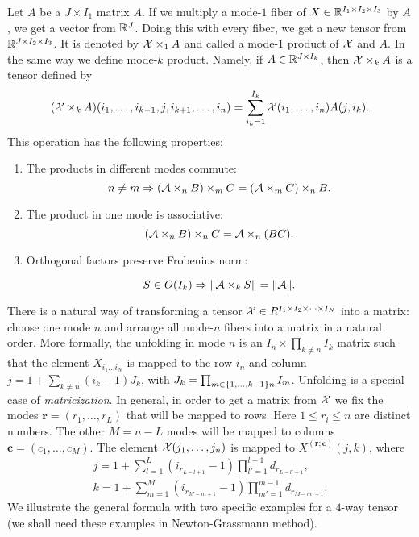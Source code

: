 Let $A$ be a $J \times I_1$ matrix $A$. If we multiply a mode-$1$ fiber of $X \in \mathbb{R}^{I_1 \times I_2 \times I_3}$ by $A$,
we get a vector from $\mathbb{R}^J$. Doing this with every fiber, we get a new tensor from $\mathbb{R}^{J \times I_2 \times I_3}$. It is denoted by 
$\mathcal{X} \times _{1} A$ and called a mode-$1$ product of $\mathcal{X}$ and $A$. In the same way we define mode-$k$ product. Namely,
if $A \in \mathbb{R}^{J \times I_k}$, then $\mathcal{X} \times_k A$ is a tensor defined by
\begin{equation}
    (\mathcal{X} \times_k A)(i_1, \dots, i_{k-1}, j, i_{k+1}, \dots, i_n) = \sum_{i_k = 1}^{I_k} \mathcal{X}(i_1, \dots, i_n) A(j, i_k).
\end{equation}
This operation has the following properties:
\begin{enumerate}
\item The products in different modes commute:
\begin{equation}
n \not= m \Rightarrow (\mathcal{A} \times _n B) \times_m C = (\mathcal{A} \times _m C) \times_n B.
\end{equation}
\item The product in one mode is associative:
\begin{equation}
(\mathcal{A} \times_n B) \times_n C = \mathcal{A} \times_n (BC).
\end{equation}
\item Orthogonal factors preserve Frobenius norm:

\begin{equation}
\label{orthogonal_norm_inv}
S \in O(I_k)  \Rightarrow \| \mathcal{A} \times_k S \| = \| \mathcal{A} \|.
\end{equation}
\end{enumerate}

There is a natural way of transforming a tensor $\mathcal{X} \in R^{I_1 \times I_2 \times \cdots \times I_N}$ into a matrix: choose one mode $n$
and arrange all mode-$n$ fibers into a matrix in a natural order. More formally,
the unfolding in mode $n$ is an $I_n \times \prod_{k \neq n} I_k$ matrix such that
the element $X_{i_1 \dots i_N}$ is mapped to the row $i_n$ and column $j = 1 + \sum_{ k \neq n} (i_k - 1) J_k$,
with $J_k = \prod_{ m \in \{ 1, \dots, k-1 \} \\ {n} } I_m$.
 Unfolding  is a special case of \textit{matricization}. In general, in order to get a matrix
from $\mathcal{X}$ we fix the modes $\mathbf{r} =  (r_1, \dots, r_L)$ that will be mapped to rows.
Here $1 \leq r_i \leq n$ are distinct numbers. The other $M = n - L$  modes will be mapped
to columns $\mathbf{c} = (c_1, \dots, c_M)$.
The element $\mathcal{X}(j_1, \dots, j_n)$ is mapped to $X^{(\mathbf{r};\mathbf{c})}(j, k)$, where
\begin{eqnarray}
    j = 1 + \sum_{l = 1}^{L} ( i_{r_{L-l+1}} - 1) \prod_{l' = 1}^{l - 1} d_{r_{L - l' + 1}}, \\
    k = 1 + \sum_{m = 1}^{M} ( i_{r_{M-m+1}} - 1) \prod_{m' = 1}^{m - 1} d_{r_{M - m' + 1}}.
\end{eqnarray}
We illustrate the general formula with two specific examples
for a $4$-way tensor (we shall need these examples in Newton-Grassmann method).

